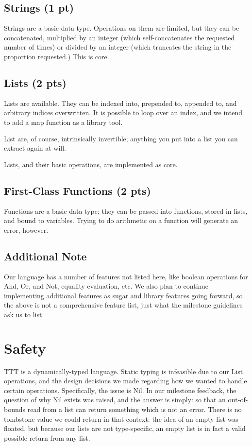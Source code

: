 \documentclass{article}
\begin{document}
\subsection*{Strings (1 pt)}
Strings are a basic data type.  Operations on them are limited, but they can be concatenated, multiplied by an integer (which self-concatenates the requested number of times) or divided by an integer (which truncates the string in the proportion requested.)  This is core.

\subsection*{Lists (2 pts)}
Lists are available.  They can be indexed into, prepended to, appended to, and arbitrary indices overwritten.  It is possible to loop over an index, and we intend to add a map function as a library tool.

List are, of course, intrinsically invertible; anything you put into a list you can extract again at will.

Lists, and their basic operations, are implemented as core.

\subsection*{First-Class Functions (2 pts)}
Functions are a basic data type; they can be passed into functions, stored in lists, and bound to variables.  Trying to do arithmetic on a function will generate an error, however.

\subsection*{Additional Note}
Our language has a number of features not listed here, like boolean operations for And, Or, and Not, equality evaluation, etc.  We also plan to continue implementing additional features as sugar and library features going forward, so the above is not a comprehensive feature list, just what the milestone guidelines ask us to list.

\section*{Safety}

\"T\"T\"T is a dynamically-typed language.  Static typing is infeasible due to our List operations, and the design decisions we made regarding how we wanted to handle certain operations.  Specifically, the issue is Nil.  In our milestone feedback, the question of why Nil exists was raised, and the answer is simply: so that an out-of-bounds read from a list can return something which is not an error.  There is no tombstone value we could return in that context: the idea of an empty list was floated, but because our lists are not type-specific, an empty list is in fact a valid possible return from any list.
\end{document}
